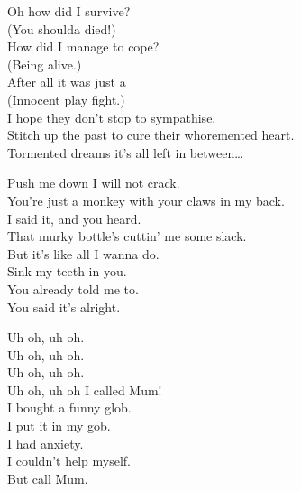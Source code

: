 Oh how did I survive? \\
(You shoulda died!) \\
How did I manage to cope? \\
(Being alive.) \\
After all it was just a \\
(Innocent play fight.) \\
I hope they don't stop to sympathise. \\

Stitch up the past to cure their whoremented heart. \\

Tormented dreams it's all left in between… \\




Push me down I will not crack. \\
You're just a monkey with your claws in my back. \\
I said it, and you heard. \\
That murky bottle's cuttin' me some slack. \\

But it's like all I wanna do. \\
Sink my teeth in you. \\
You already told me to. \\
You said it's alright. \\




Uh oh, uh oh. \\
Uh oh, uh oh. \\
Uh oh, uh oh. \\
Uh oh, uh oh I called Mum! \\

I bought a funny glob. \\
I put it in my gob. \\
I had anxiety. \\
I couldn't help myself. \\
But call Mum. \\


